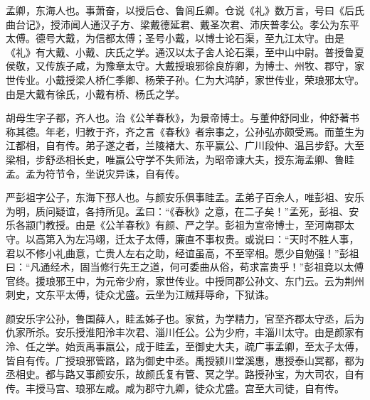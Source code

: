 \documentclass[12pt,UTF8]{ctexbook}
\begin{document}
孟卿，东海人也。事萧奋，以授后仓、鲁闾丘卿。仓说《礼》数万言，号曰《后氏曲台记》，授沛闻人通汉子方、梁戴德延君、戴圣次君、沛庆普孝公。孝公为东平太傅。德号大戴，为信都太傅；圣号小戴，以博士论石渠，至九江太守。由是《礼》有大戴、小戴、庆氏之学。通汉以太子舍人论石渠，至中山中尉。普授鲁夏侯敬，又传族子咸，为豫章太守。大戴授琅邪徐良斿卿，为博士、州牧、郡守，家世传业。小戴授梁人桥仁季卿、杨荣子孙。仁为大鸿胪，家世传业，荣琅邪太守。由是大戴有徐氏，小戴有桥、杨氏之学。



胡母生字子都，齐人也。治《公羊春秋》，为景帝博士。与董仲舒同业，仲舒著书称其德。年老，归教于齐，齐之言《春秋》者宗事之，公孙弘亦颇受焉。而董生为江都相，自有传。弟子遂之者，兰陵褚大、东平赢公、广川段仲、温吕步舒。大至梁相，步舒丞相长史，唯赢公守学不失师法，为昭帝谏大夫，授东海孟卿、鲁眭孟。孟为符节令，坐说灾异诛，自有传。



严彭祖字公子，东海下邳人也。与颜安乐俱事眭孟。孟弟子百余人，唯彭祖、安乐为明，质问疑谊，各持所见。孟曰：“《春秋》之意，在二子矣！”孟死，彭祖、安乐各颛门教授。由是《公羊春秋》有颜、严之学。彭祖为宣帝博士，至河南郡太守。以高第入为左冯翊，迁太子太傅，廉直不事权贵。或说曰：“天时不胜人事，君以不修小礼曲意，亡贵人左右之助，经谊虽高，不至宰相。愿少自勉强！”彭祖曰：“凡通经术，固当修行先王之道，何可委曲从俗，苟求富贵乎！”彭祖竟以太傅官终。援琅邪王中，为元帝少府，家世传业。中授同郡公孙文、东门云。云为荆州刺史，文东平太傅，徒众尤盛。云坐为江贼拜辱命，下狱诛。



颜安乐字公孙，鲁国薛人，眭孟姊子也。家贫，为学精力，官至齐郡太守丞，后为仇家所杀。安乐授淮阳泠丰次君、淄川任公。公为少府，丰淄川太守。由是颜家有泠、任之学。始贡禹事嬴公，成于眭孟，至御史大夫，疏广事孟卿，至太子太傅，皆自有传。广授琅邪管路，路为御史中丞。禹授颍川堂溪惠，惠授泰山冥都，都为丞相史。都与路又事颜安乐，故颜氏复有管、冥之学。路授孙宝，为大司农，自有传。丰授马宫、琅邪左咸。咸为郡守九卿，徒众尤盛。宫至大司徒，自有传。
\end{document}
